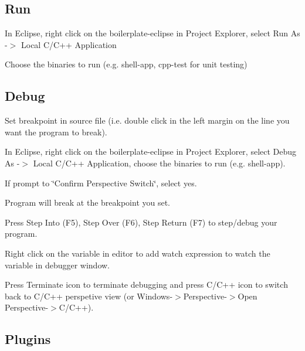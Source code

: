 \subsection*{Run}


\begin{DoxyEnumerate}
\item In Eclipse, right click on the boilerplate-\/eclipse in Project Explorer, select Run As -\/$>$ Local C/\+C++ Application
\item Choose the binaries to run (e.\+g. shell-\/app, cpp-\/test for unit testing)
\end{DoxyEnumerate}

\subsection*{Debug}


\begin{DoxyEnumerate}
\item Set breakpoint in source file (i.\+e. double click in the left margin on the line you want the program to break).
\item In Eclipse, right click on the boilerplate-\/eclipse in Project Explorer, select Debug As -\/$>$ Local C/\+C++ Application, choose the binaries to run (e.\+g. shell-\/app).
\item If prompt to \char`\"{}\+Confirm Perspective Switch\char`\"{}, select yes.
\item Program will break at the breakpoint you set.
\item Press Step Into (F5), Step Over (F6), Step Return (F7) to step/debug your program.
\item Right click on the variable in editor to add watch expression to watch the variable in debugger window.
\item Press Terminate icon to terminate debugging and press C/\+C++ icon to switch back to C/\+C++ perspetive view (or Windows-\/$>$Perspective-\/$>$Open Perspective-\/$>$C/\+C++).
\end{DoxyEnumerate}

\subsection*{Plugins}


